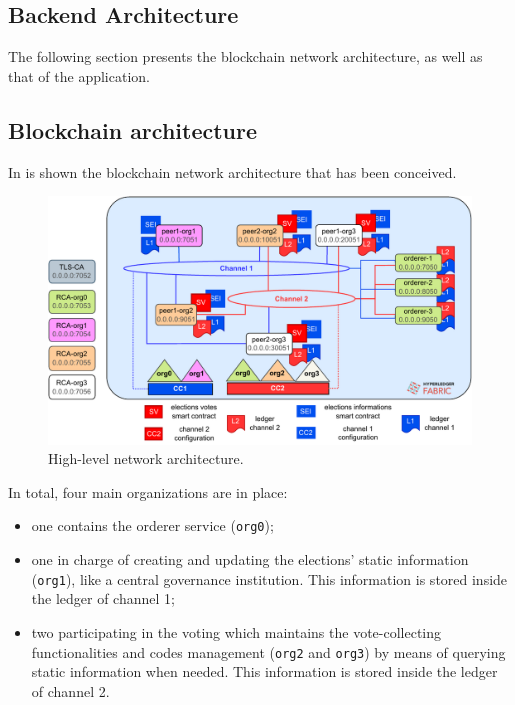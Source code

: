 \documentclass{scrartcl}
\begin{document}
\subsection{Backend Architecture}

\iffalse

The following section presents the blockchain network architecture, as well as that of the application.

\subsection{Blockchain architecture}
\label{subsec:blockchain-architecture}

In  is shown the blockchain network architecture that has been conceived.

\begin{figure}
    \centering
    \includegraphics[width=\linewidth]{figures/network-architecture.pdf}
    \caption{High-level network architecture.}
    \label{fig:network-architecture}
\end{figure}

In total, four main organizations are in place:
\begin{itemize}
    \item one contains the orderer service (\texttt{org0});
    \item one in charge of creating and updating the elections' static information (\texttt{org1}), like a central governance institution. This information is stored inside the ledger of channel 1;
    \item two participating in the voting which maintains the vote-collecting functionalities and codes management (\texttt{org2} and \texttt{org3}) by means of querying static information when needed. This information is stored inside the ledger of channel 2.
\end{itemize} 
\end{document}
